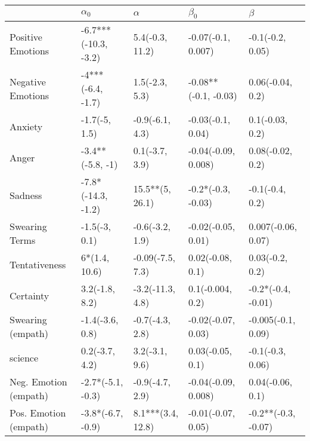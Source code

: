 \begin{tabular}{lllll}
\toprule
{} &            $\alpha_0$ &           $\alpha$ &             $\beta_0$ &              $\beta$ \\
\midrule
Positive Emotions     &  -6.7***(-10.3, -3.2) &    5.4(-0.3, 11.2) &    -0.07(-0.1, 0.007) &     -0.1(-0.2, 0.05) \\
Negative Emotions     &     -4***(-6.4, -1.7) &     1.5(-2.3, 5.3) &  -0.08**(-0.1, -0.03) &     0.06(-0.04, 0.2) \\
Anxiety               &         -1.7(-5, 1.5) &    -0.9(-6.1, 4.3) &     -0.03(-0.1, 0.04) &      0.1(-0.03, 0.2) \\
Anger                 &      -3.4**(-5.8, -1) &     0.1(-3.7, 3.9) &   -0.04(-0.09, 0.008) &     0.08(-0.02, 0.2) \\
Sadness               &    -7.8*(-14.3, -1.2) &    15.5**(5, 26.1) &    -0.2*(-0.3, -0.03) &      -0.1(-0.4, 0.2) \\
Swearing Terms        &         -1.5(-3, 0.1) &    -0.6(-3.2, 1.9) &    -0.02(-0.05, 0.01) &   0.007(-0.06, 0.07) \\
Tentativeness         &         6*(1.4, 10.6) &   -0.09(-7.5, 7.3) &      0.02(-0.08, 0.1) &      0.03(-0.2, 0.2) \\
Certainty             &        3.2(-1.8, 8.2) &   -3.2(-11.3, 4.8) &      0.1(-0.004, 0.2) &   -0.2*(-0.4, -0.01) \\
Swearing (empath)     &       -1.4(-3.6, 0.8) &    -0.7(-4.3, 2.8) &    -0.02(-0.07, 0.03) &   -0.005(-0.1, 0.09) \\
science               &        0.2(-3.7, 4.2) &     3.2(-3.1, 9.6) &      0.03(-0.05, 0.1) &     -0.1(-0.3, 0.06) \\
Neg. Emotion (empath) &     -2.7*(-5.1, -0.3) &    -0.9(-4.7, 2.9) &   -0.04(-0.09, 0.008) &     0.04(-0.06, 0.1) \\
Pos. Emotion (empath) &     -3.8*(-6.7, -0.9) &  8.1***(3.4, 12.8) &    -0.01(-0.07, 0.05) &  -0.2**(-0.3, -0.07) \\
\bottomrule
\end{tabular}
